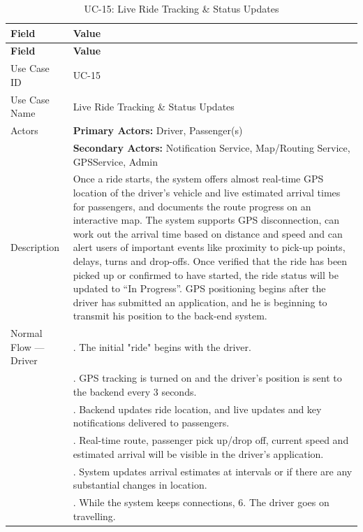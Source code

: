 \begin{longtable}{|>{\raggedright\arraybackslash}p{4cm}|>{\raggedright\arraybackslash}p{11cm}|}
\caption{UC-15: Live Ride Tracking \& Status Updates}
\label{tab:uc-15} \\
\hline
\rowcolor{lightgray!30}
\textbf{Field} & \textbf{Value} \\
\hline
\endfirsthead
\hline
\rowcolor{lightgray!30}
\textbf{Field} & \textbf{Value} \\
\hline
\endhead
\hline
\endfoot
\hline
\endlastfoot
Use Case ID & UC-15 \\
\hline
Use Case Name & Live Ride Tracking \& Status Updates \\
\hline
Actors & \textbf{Primary Actors:} Driver, Passenger(s) \\
& \textbf{Secondary Actors:} Notification Service, Map/Routing Service, GPSService, Admin \\
\hline
Description & Once a ride starts, the system offers almost real-time GPS location of the driver's vehicle and live estimated arrival times for passengers, and documents the route progress on an interactive map. The system supports GPS disconnection, can work out the arrival time based on distance and speed and can alert users of important events like proximity to pick-up points, delays, turns and drop-offs. Once verified that the ride has been picked up or confirmed to have started, the ride status will be updated to “In Progress”. GPS positioning begins after the driver has submitted an application, and he is beginning to transmit his position to the back-end system. \\
\hline
Normal Flow — Driver & 1. The initial "ride" begins with the driver. \\
&2. GPS tracking is turned on and the driver's position is sent to the backend every 3 seconds. \\
&3. Backend updates ride location, and live updates and key notifications delivered to passengers. \\
&4. Real-time route, passenger pick up/drop off, current speed and estimated arrival will be visible in the driver's application. \\
&5. System updates arrival estimates at intervals or if there are any substantial changes in location. \\
&6. While the system keeps connections, 6. The driver goes on travelling. \\

\end{longtable}
